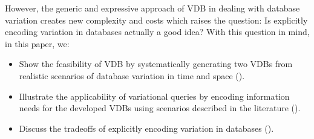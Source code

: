 However, the generic and expressive approach of VDB in dealing with database
variation creates new complexity and costs which raises the question: Is
explicitly encoding variation in databases actually a good idea?
%
With this question in mind, in this paper, we:
%
\begin{itemize}
%
\item Show the feasibility of VDB by systematically generating two VDBs from
realistic scenarios of database variation in time and space ().
%
\item Illustrate the applicability of variational queries by encoding
information needs for the developed VDBs using scenarios described in the
literature ().
%
\item Discuss the tradeoffs of explicitly encoding variation in databases
().
%
\end{itemize}








